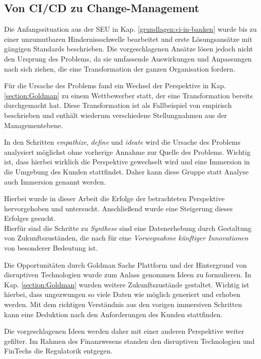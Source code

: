 \subsection{Von CI/CD zu Change-Management}
Die Anfangssituation aus der \ac{SEU} in Kap. \ref{grundlagen:ci-in-banken} wurde bis zu einer unzumutbaren Hindernissschwelle bearbeitet und erste Lösungsansätze mit gängigen Standards beschrieben. Die vorgeschlagenen Ansätze lösen jedoch nicht den Ursprung des Problems, da sie umfassende Auswirkungen und Anpassungen nach sich ziehen, die eine Transformation der ganzen Organisation fordern. 

Für die Ursache des Problems fand ein Wechsel der Perspektive in Kap. \ref{section:Goldman} zu einem Wettbewerber statt, der eine Transformation bereits durchgemacht hat. Diese Transformation ist als Fallbeispiel von \citet{Gupta:2017} empirisch beschrieben und enthält wiederum verschiedene Stellungnahmen aus der Managementebene.

In den Schritten \emph{empathize}, \emph{define} und \emph{ideate} wird die Ursache des Problems analysiert möglichst ohne vorherige Annahme zur Quelle des Problems. Wichtig ist, dass hierbei wirklich die Perspektive gewechselt wird und eine Immersion in die Umgebung des Kunden stattfindet. Daher kann diese Gruppe statt Analyse \cite{yüksel:digit} auch Immersion genannt werden. 

Hierbei wurde in dieser Arbeit die Erfolge der betrachteten Perspektive hervorgehoben und untersucht. Anschließend wurde eine Steigerung dieses Erfolges gesucht.
\medskip
\\
Hierfür sind die Schritte zu \emph{Synthese} sind eine Datenerhebung \cite[S. 61]{yüksel:digit} durch Gestaltung von Zukunftszuständen, die nach \citet[S. 14]{Alt2017} für eine \emph{Vorwegnahme künftiger Innovationen} von besonderer Bedeutung ist. 

Die Opportunitäten durch Goldman Sachs Plattform \cite{Gupta:2017} und der Hintergrund von disruptiven Technologien \cite{Fernandez:2020} wurde zum Anlass genommen Ideen zu formulieren. In Kap. \ref{section:Goldman} wurden weitere Zukunftszustände gestaltet.
Wichtig ist hierbei, dass ungezwungen so viele Daten wie möglich generiert und erhoben werden. Mit dem richtigen Verständnis aus den vorigen immersiven Schritten kann eine Deduktion nach den Anforderungen des Kunden stattfinden. 

Die vorgeschlagenen Ideen werden daher mit einer anderen Perspektive weiter gefilter. Im Rahmen des Finanzwesens standen den disruptiven Technologien und FinTechs die Regulatorik entgegen.

